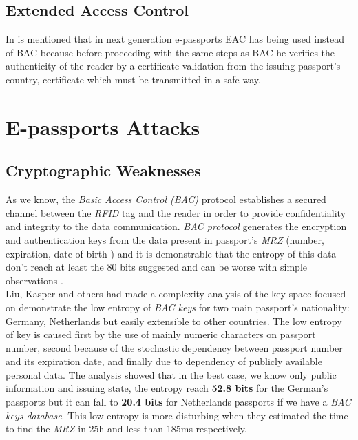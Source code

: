 \documentclass{acm_proc_article-sp}
\begin{document}
\subsection{Extended Access Control}
In \cite{NM12} is mentioned that in next generation e-passports EAC has being used 
instead of BAC because before proceeding with the same steps as BAC he verifies the 
authenticity of the reader by a certificate validation from the issuing passport’s country, 
certificate which must be transmitted in a safe way.


\section{E-passports Attacks}

\subsection{Cryptographic Weaknesses}
As we know, the \textit{Basic Access Control (BAC)} protocol establishes a secured channel between 
the \textit{RFID} tag and the reader in order to provide confidentiality and integrity to the 
data communication. \textit{BAC protocol} generates the encryption and authentication keys from the data 
present in passport's \textit {MRZ} (number, expiration, date of birth ) and it is demonstrable 
that the entropy of this data don’t reach at least the 80 bits suggested and can be worse 
with simple observations \cite{JUAR2005} \cite{02COPA}.\\
Liu, Kasper and others \cite{02COPA} had made a complexity analysis of the key space focused on 
demonstrate the low entropy of \textit{BAC keys} for two main passport’s nationality: Germany, 
Netherlands but easily extensible to other countries. The low entropy of key is caused 
first by the use of mainly numeric characters on passport number, 
second because of the stochastic dependency between passport number and its expiration 
date, and finally due to dependency of publicly available personal data. The analysis 
showed that in the best case, we know only public information and issuing state, the 
entropy reach \textbf {52.8 bits} for the German’s passports but it can fall to \textbf {20.4 bits} for 
Netherlands passports if we have a \textit{BAC keys database}. This low entropy is more disturbing 
when they estimated the time to find the \textit{MRZ} in 25h and less than 185ms 
respectively.
\end{document}
